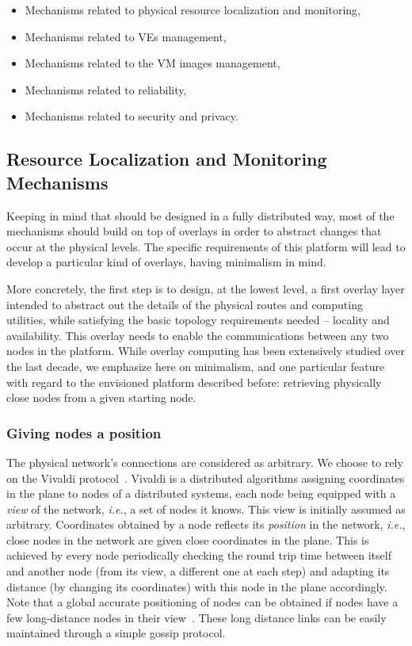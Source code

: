 \begin{itemize}
\item Mechanisms related to physical resource localization and monitoring, 
\item Mechanisms related to VEs management, 
\item Mechanisms related to the VM images management, 
\item Mechanisms related to reliability,
\item Mechanisms related to security and privacy.
\end{itemize}

\subsection{Resource Localization and Monitoring Mechanisms\label{ssec:p2p}}

Keeping in mind that \discovery should be designed in a fully distributed way,
most of the mechanisms should build on top of overlays in order to abstract changes
that occur at the physical levels. The specific requirements of this platform
will lead to develop a particular kind of overlays, having minimalism in mind.

More concretely, the first step is to design, at the lowest level, a first
overlay layer intended to abstract out the details of the physical routes and
computing utilities, while satisfying the basic topology requirements needed --
locality and availability. This overlay needs to enable the communications
between any two nodes in the platform. While overlay computing has been
extensively studied over the last decade, we emphasize here on minimalism, and
one particular feature with regard to the envisioned platform described before:
retrieving physically close nodes from a given starting node.

\subsubsection*{Giving nodes a position}

The physical network's connections are considered as arbitrary. We choose to
rely on the Vivaldi protocol~\cite{dabek:2001:sigcomm04}. Vivaldi is a
distributed algorithms assigning coordinates in the plane to nodes of a
distributed systems, each node being equipped with a \emph{view} of the network,
\emph{i.e.}, a set of nodes it knows. This view is initially assumed as
arbitrary. Coordinates obtained by a node reflects its \emph{position} in the
network, \emph{i.e.}, close nodes in the network are given close coordinates in
the plane. This is achieved by every node periodically checking the round trip
time between itself and another node (from its view, a different one at each
step) and adapting its distance (by changing its coordinates) with this node in
the plane accordingly. Note that a global accurate positioning of nodes can be
obtained if nodes have a few long-distance nodes in their
view~\cite{dabek:2001:sigcomm04}. These long distance links can be easily
maintained through a simple gossip protocol.

